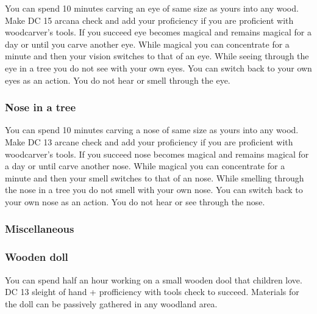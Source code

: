 You can spend 10 minutes carving an eye of same size as yours into any wood. Make DC 15 arcana check and add your proficiency if you are proficient with woodcarver's tools. If you succeed eye becomes magical and remains magical for a day or until you carve another eye. While magical you can concentrate for a minute and then your vision switches to that of an eye. While seeing through the eye in a tree you do not see with your own eyes. You can switch back to your own eyes as an action. You do not hear or smell through the eye.

\subsubsection{Nose in a tree}

You can spend 10 minutes carving a nose of same size as yours into any wood. Make DC 13 arcane check and add your proficiency if you are proficient with woodcarver's tools. If you succeed nose becomes magical and remains magical for a day or until carve another nose. While magical you can concentrate for a minute and then your smell switches to that of an nose. While smelling through the nose in a tree you do not smell with your own nose. You can switch back to your own nose as an action. You do not hear or see through the nose.

\subsubsection{Miscellaneous}

\subsubsection{Wooden doll}

You can spend half an hour working on a small wooden dool that children love. DC 13 sleight of hand + profficiency with tools check to succeed. Materials for the doll can be passively gathered in any woodland area.
